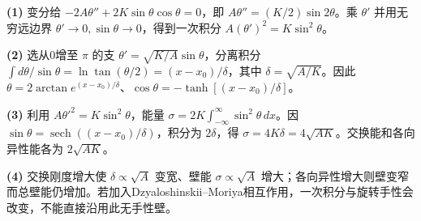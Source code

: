 \par\noindent\textbf{(1)} 变分给 \(-2A\theta''+2K\sin\theta\cos\theta=0\)，即 \(A\theta''=(K/2)\sin2\theta\)。乘 \(\theta'\) 并用无穷远边界 \(\theta'\to0,\sin\theta\to0\)，得到一次积分 \(A(\theta')^2=K\sin^2\theta\)。
\par\noindent\textbf{(2)} 选从0增至 \(\pi\) 的支 \(\theta'=\sqrt{K/A}\sin\theta\)，分离积分 \(\int d\theta/\sin\theta=\ln\tan(\theta/2)=(x-x_0)/\delta\)，其中 \(\delta=\sqrt{A/K}\)。因此 \(\theta=2\arctan e^{(x-x_0)/\delta}\)、\(\cos\theta=-\tanh[(x-x_0)/\delta]\)。
\par\noindent\textbf{(3)} 利用 \(A\theta'^2=K\sin^2\theta\)，能量 \(\sigma=2K\int_{-\infty}^\infty\sin^2\theta\,dx\)。因 \(\sin\theta=\operatorname{sech}((x-x_0)/\delta)\)，积分为 \(2\delta\)，得 \(\sigma=4K\delta=4\sqrt{AK}\)。交换能和各向异性能各为 \(2\sqrt{AK}\)。
\par\noindent\textbf{(4)} 交换刚度增大使 \(\delta\propto\sqrt A\) 变宽、壁能 \(\sigma\propto\sqrt A\) 增大；各向异性增大则壁变窄而总壁能仍增加。若加入Dzyaloshinskii–Moriya相互作用，一次积分与旋转手性会改变，不能直接沿用此无手性壁。
